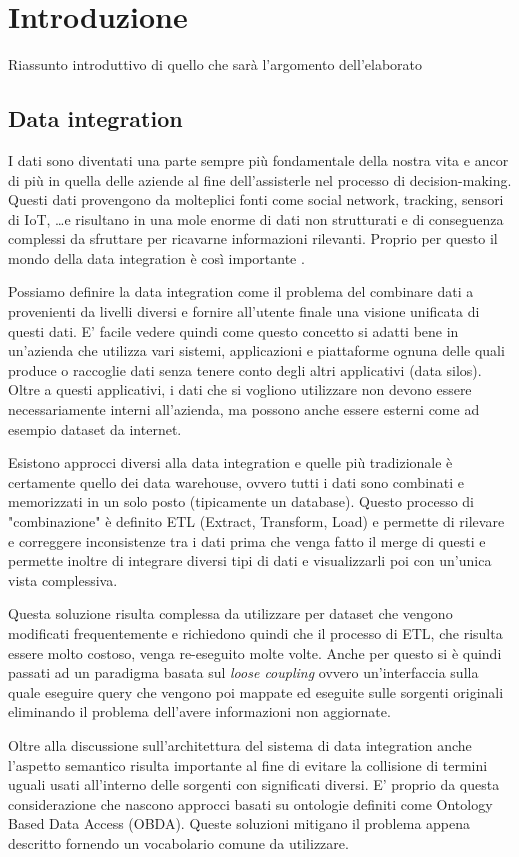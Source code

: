 \chapter{Introduzione}
\label{cha:intro}
Riassunto introduttivo di quello che sarà l'argomento dell'elaborato

\section{Data integration}
I dati sono diventati una parte sempre più fondamentale della nostra vita e ancor di più in quella delle aziende al fine dell'assisterle nel processo di decision-making.
Questi dati provengono da molteplici fonti come social network, tracking, sensori di IoT, \dots e risultano in una mole enorme di dati non strutturati e
di conseguenza complessi da sfruttare per ricavarne informazioni rilevanti.
Proprio per questo il mondo della data integration è così importante \cite{DataIntegration}.

Possiamo definire la data integration come il problema del combinare dati a provenienti da livelli diversi e fornire all'utente finale una 
visione unificata di questi dati\cite{dataIntegrationDef}. E' facile vedere quindi come questo concetto si adatti bene in un'azienda che utilizza vari sistemi, applicazioni 
e piattaforme ognuna delle quali produce o raccoglie dati senza tenere conto degli altri applicativi (data silos). Oltre a questi applicativi, i dati che si vogliono utilizzare non 
devono essere necessariamente interni all'azienda, ma possono anche essere esterni come ad esempio dataset da internet.

Esistono approcci diversi alla data integration e quelle più tradizionale è certamente quello dei data warehouse, ovvero tutti i dati sono combinati e memorizzati in un solo posto (tipicamente un database). 
Questo processo di "combinazione" è definito ETL (Extract, Transform, Load) e permette di rilevare e correggere inconsistenze tra i dati prima che venga fatto il merge di questi e permette inoltre di integrare 
diversi tipi di dati e visualizzarli poi con un'unica vista complessiva.

Questa soluzione risulta complessa da utilizzare per dataset che vengono modificati frequentemente e richiedono quindi che il processo di ETL, che risulta essere molto costoso, venga re-eseguito molte volte.
Anche per questo si è quindi passati ad un paradigma basata sul \textit{loose coupling} ovvero un'interfaccia sulla quale eseguire query che vengono poi mappate ed eseguite sulle sorgenti originali eliminando il 
problema dell'avere informazioni non aggiornate. 

Oltre alla discussione sull'architettura del sistema di data integration anche l'aspetto semantico risulta importante al fine di evitare la collisione di termini uguali usati all'interno delle sorgenti con significati
diversi. E' proprio da questa considerazione che nascono approcci basati su ontologie definiti come Ontology Based Data Access (OBDA). Queste soluzioni mitigano il problema appena descritto fornendo un vocabolario 
comune da utilizzare. 

